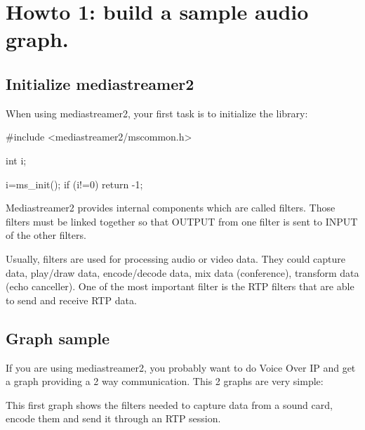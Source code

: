 \section{Howto 1\+: build a sample audio graph.}
\label{group__howto0__samplegraph}
\subsection*{Initialize mediastreamer2}

When using mediastreamer2, your first task is to initialize the library\+:


\begin{DoxyPre}
        #include <mediastreamer2/mscommon.h>\end{DoxyPre}



\begin{DoxyPre}        int i;\end{DoxyPre}



\begin{DoxyPre}        i=ms\_init();
        if (i!=0)
          return -1;\end{DoxyPre}



\begin{DoxyPre}\end{DoxyPre}


Mediastreamer2 provides internal components which are called filters. Those filters must be linked together so that O\+U\+T\+P\+UT from one filter is sent to I\+N\+P\+UT of the other filters.

Usually, filters are used for processing audio or video data. They could capture data, play/draw data, encode/decode data, mix data (conference), transform data (echo canceller). One of the most important filter is the R\+TP filters that are able to send and receive R\+TP data.

\subsection*{Graph sample}

If you are using mediastreamer2, you probably want to do Voice Over IP and get a graph providing a 2 way communication. This 2 graphs are very simple\+:

This first graph shows the filters needed to capture data from a sound card, encode them and send it through an R\+TP session.


